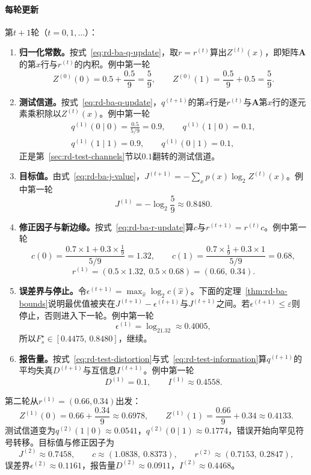 \paragraph{每轮更新}
第$t+1$轮（$t=0,1,\dots$）：
\begin{enumerate}
  \item \textbf{归一化常数。}按式~\eqref{eq:rd-ba-q-update}，取$r=r^{(t)}$算出$Z^{(t)}(x)$，即矩阵$\bm{A}$的第$x$行与$r^{(t)}$的内积。例中第一轮
  \[
    Z^{(0)}(0)=0.5+\frac{0.5}{9}=\frac59,\qquad Z^{(0)}(1)=\frac{0.5}{9}+0.5=\frac59 .
  \]

  \item \textbf{测试信道。}按式~\eqref{eq:rd-ba-q-update}，$q^{(t+1)}$的第$x$行是$r^{(t)}$与$\bm{A}$第$x$行的逐元素乘积除以$Z^{(t)}(x)$。例中第一轮
  \[
    \begin{gathered}
    q^{(1)}(0\mid0)=\frac{0.5}{5/9}=0.9,\qquad q^{(1)}(1\mid0)=0.1,\\
    q^{(1)}(1\mid1)=0.9,\qquad q^{(1)}(0\mid1)=0.1 ,
    \end{gathered}
  \]
  正是第~\ref{sec:rd-test-channels}节以$0.1$翻转的测试信道。

  \item \textbf{目标值。}由式~\eqref{eq:rd-ba-j-value}，$J^{(t+1)}=-\sum_xp(x)\log_2Z^{(t)}(x)$。例中第一轮
  \[
    J^{(1)}=-\log_2\frac59\approx0.8480 .
  \]

  \item \textbf{修正因子与新边缘。}按式~\eqref{eq:rd-ba-r-update}算$c$与$r^{(t+1)}=r^{(t)}c$。例中第一轮
  \[
    c(0)=\frac{0.7\times1+0.3\times\frac19}{5/9}=1.32,\qquad c(1)=\frac{0.7\times\frac19+0.3\times1}{5/9}=0.68,
  \]
  \[
    r^{(1)}=(0.5\times1.32,\ 0.5\times0.68)=(0.66,\ 0.34).
  \]

  \item \textbf{误差界与停止。}令$\epsilon^{(t+1)}=\max_{\hat{x}}\log_2c(\hat{x})$。下面的定理~\ref{thm:rd-ba-bounds}说明最优值被夹在$J^{(t+1)}-\epsilon^{(t+1)}$与$J^{(t+1)}$之间。若$\epsilon^{(t+1)}\leq\varepsilon$则停止，否则进入下一轮。例中第一轮
  \[
    \epsilon^{(1)}=\log_21.32\approx0.4005,
  \]
  所以$F_s^{\star}\in[0.4475,\,0.8480]$，继续。

  \item \textbf{报告量。}按式~\eqref{eq:rd-test-distortion}与式~\eqref{eq:rd-test-information}算$q^{(t+1)}$的平均失真$D^{(t+1)}$与互信息$I^{(t+1)}$。例中第一轮
  \[
    D^{(1)}=0.1,\qquad I^{(1)}\approx0.4558 .
  \]
\end{enumerate}

第二轮从$r^{(1)}=(0.66,0.34)$出发：
\[
  Z^{(1)}(0)=0.66+\frac{0.34}{9}\approx0.6978,\qquad Z^{(1)}(1)=\frac{0.66}{9}+0.34\approx0.4133 .
\]
测试信道变为$q^{(2)}(1\mid0)\approx0.0541$，$q^{(2)}(0\mid1)\approx0.1774$，错误开始向罕见符号转移。目标值与修正因子为
\[
  J^{(2)}\approx0.7458,\qquad c\approx(1.0838,\ 0.8373),\qquad r^{(2)}\approx(0.7153,\ 0.2847),
\]
误差界$\epsilon^{(2)}\approx0.1161$，报告量$D^{(2)}\approx0.0911$，$I^{(2)}\approx0.4468$。

